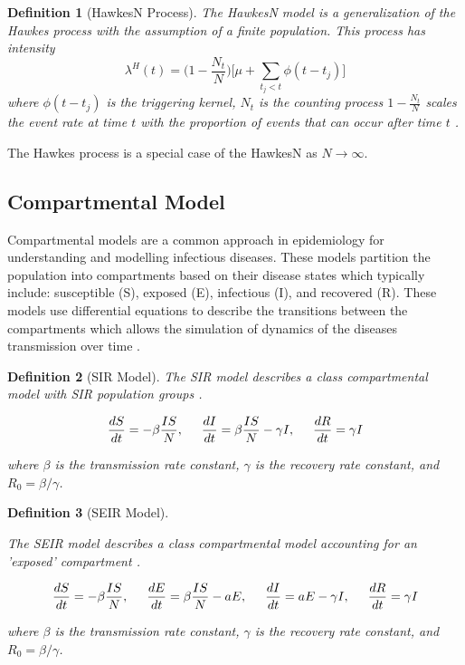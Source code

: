 \documentclass[12pt]{article}
\newtheorem{definition}{Definition}
\begin{document}
\begin{definition}[HawkesN Process] 
The HawkesN model is a generalization of the Hawkes process with the assumption of a finite population. This process has intensity
$$
\lambda^H(t) = \Big ( 1 - \frac{N_t}{N} \Big ) \Big [ \mu + \sum_{t_j < t} \phi (t - t_j) \Big ]
$$  
where $\phi( t - t_j)$ is the triggering kernel, $N_t$ is the counting process $ 1 - \frac{N_t}{N}$ scales the event rate at time $t$ with the proportion of events that can occur after time $t$ \cite{Rizoiu2018}. 
  
\end{definition}


The Hawkes process is a special case of the HawkesN as $N \to \infty$. 


\subsection{Compartmental Model}

Compartmental models are a common approach in epidemiology for understanding and modelling infectious diseases. These models partition the population into compartments based on their disease states which typically include: susceptible (S), exposed (E), infectious (I), and recovered (R). These models use differential equations to describe the transitions between the compartments which allows the simulation of dynamics of the diseases transmission over time \cite{Bertozzi2020}. 
\\

\begin{definition}[SIR Model]
The SIR model describes a class compartmental model with SIR population groups \cite{Bertozzi2020}. 

$$
\frac{dS}{dt} = - \beta \frac{IS}{N}, \hspace{5mm}
\frac{dI}{dt} = \beta \frac{IS}{N} - \gamma I, \hspace{5mm}
\frac{dR}{dt} = \gamma I 
$$

where $\beta$ is the transmission rate constant, $\gamma$ is the recovery rate constant, and $R_0 = \beta/\gamma$. 

\end{definition}
\vspace{3mm}



\begin{definition}[SEIR Model]
\label{SEIR}

The SEIR model describes a class compartmental model accounting for an 'exposed' compartment \cite{Bertozzi2020}. 

$$
\frac{dS}{dt} = - \beta \frac{IS}{N}, \hspace{5mm}
\frac{dE}{dt} = \beta \frac{IS}{N} - a E, \hspace{5mm}
\frac{dI}{dt} = aE - \gamma I, \hspace{5mm}
\frac{dR}{dt} = \gamma I 
$$

where $\beta$ is the transmission rate constant, $\gamma$ is the recovery rate constant, and $R_0 = \beta/\gamma$. 

\end{definition}
\vspace{3mm}
\end{document}

